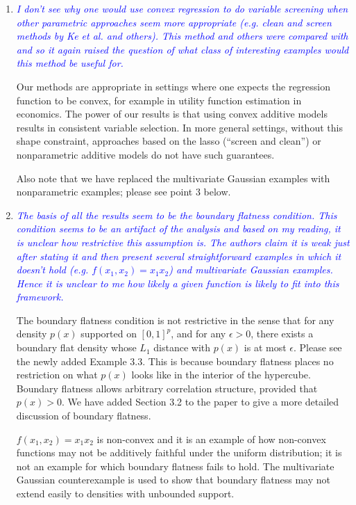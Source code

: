 \documentclass[pdftex,12pt]{article}
\def\rc#1{{\it\textcolor{blue}{#1}}\smallskip}
\begin{document}
\begin{enumerate}

\item \rc{I don't see why one would use convex regression to do
  variable screening when other parametric approaches seem more
  appropriate (e.g. clean and screen methods by Ke et al. and
  others). This method and others were compared with and so it again
  raised the question of what class of interesting examples would this
  method be useful for.}

Our methods are appropriate in settings where one expects the
regression function to be convex, for example in utility function
estimation in economics. The power of our results is that
using convex additive models results in consistent variable selection.
In more general settings, without this shape constraint,
approaches based on the lasso (``screen and clean'') or nonparametric 
additive models do not have such guarantees. 

Also note that we have replaced the multivariate Gaussian examples with 
nonparametric examples; please see point 3 below.


\item \rc{The basis of all the results seem to be the boundary flatness
condition. This condition seems to be an artifact of the analysis and
based on my reading, it is unclear how restrictive this assumption
is. The authors claim it is weak just after stating it and then
present several straightforward examples in which it doesn't hold
(e.g. $f(x_1,x_2)=x_1 x_2$) and multivariate Gaussian examples. Hence it is unclear to me how
likely a given function is likely to fit into this framework.}

The boundary flatness condition is not restrictive in the sense that
for any density $p(x)$ supported on $[0,1]^p$, and for any $\epsilon >
0$, there exists a boundary flat density whose $L_1$ distance with
$p(x)$ is at most $\epsilon$. Please see the newly added Example
3.3. This is because boundary flatness places no restriction on what
$p(x)$ looks like in the interior of the hypercube. Boundary flatness
allows arbitrary correlation structure, provided that $p(x) > 0$. We
have added Section 3.2 to the paper to give a more detailed discussion
of boundary flatness.

$f(x_1,x_2) = x_1 x_2$ is non-convex and it is an example of how
non-convex functions may not be additively faithful under the uniform
distribution; it is not an example for which boundary flatness fails
to hold. The multivariate Gaussian counterexample is used to show
that boundary flatness may not extend easily to densities with
unbounded support.


\end{enumerate}
\end{document}
